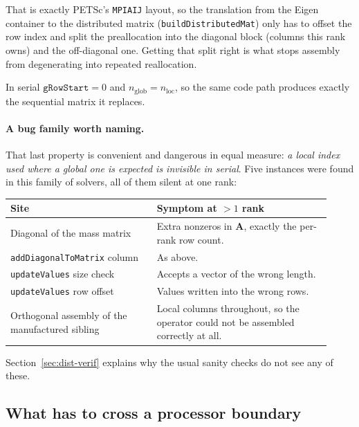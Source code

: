 \documentclass[11pt,a4paper]{article}
\newcommand{\code}[1]{\texttt{\small #1}}
\newcommand{\Aimp}{\mathbf{A}}
\begin{document}
That is exactly PETSc's \code{MPIAIJ} layout, so the translation from the Eigen
container to the distributed matrix (\code{buildDistributedMat}) only has to
offset the row index and split the preallocation into the diagonal block
(columns this rank owns) and the off-diagonal one. Getting that split right is
what stops assembly from degenerating into repeated reallocation.

In serial $\texttt{gRowStart}=0$ and $n_{\text{glob}}=n_{\text{loc}}$, so the
same code path produces exactly the sequential matrix it replaces.

\paragraph{A bug family worth naming.} That last property is convenient and
dangerous in equal measure: \emph{a local index used where a global one is
expected is invisible in serial}. Five instances were found in this family of
solvers, all of them silent at one rank:

\begin{center}
\begin{tabular}{@{}p{0.42\linewidth}p{0.50\linewidth}@{}}
\toprule
Site & Symptom at $>1$ rank \\
\midrule
Diagonal of the mass matrix & Extra nonzeros in $\Aimp$, exactly the per-rank
   row count. \\
\code{addDiagonalToMatrix} column & As above. \\
\code{updateValues} size check & Accepts a vector of the wrong length. \\
\code{updateValues} row offset & Values written into the wrong rows. \\
Orthogonal assembly of the manufactured sibling & Local columns throughout,
   so the operator could not be assembled correctly at all. \\
\bottomrule
\end{tabular}
\end{center}

Section~\ref{sec:dist-verif} explains why the usual sanity checks do not see
any of these.

\subsection{What has to cross a processor boundary}
\label{sec:dist-exchange}
\end{document}
